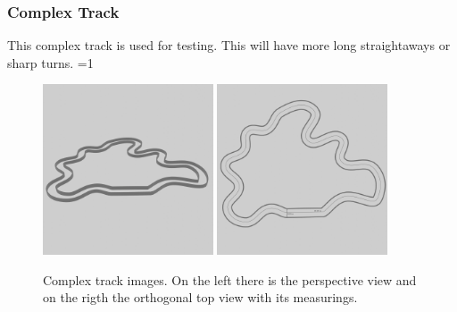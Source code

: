 \documentclass[14pt]{extarticle}
\newcounter{debug}
\begin{document}
\begin{flushleft}
	\subsubsection{Complex Track}
	This complex track is used for testing. This will have more long straightaways or sharp turns.
	\ifnum\value{debug}=1 {
	\begin{figure}[H]
    		\centering\includegraphics[width=0.45\textwidth]{./Image/Environment/Med/perspective.png}
			\centering\includegraphics[width=0.45\textwidth]{./Image/Environment/Med/top_w_line_mod.png}
    		
		\vspace{5mm}
		\caption{Complex track images. On the left there is the perspective view and on the rigth the orthogonal top view with its measurings.}
	\end{figure}
	}\fi
	

\end{flushleft}
\end{document}
